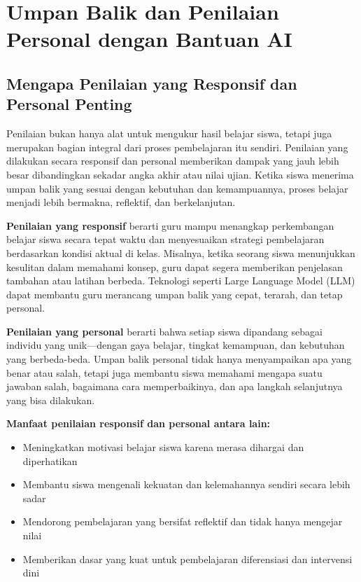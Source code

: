 \chapter{Umpan Balik dan Penilaian Personal dengan Bantuan AI}

\section{Mengapa Penilaian yang Responsif dan Personal Penting}

Penilaian bukan hanya alat untuk mengukur hasil belajar siswa, tetapi juga merupakan bagian integral dari proses pembelajaran itu sendiri. Penilaian yang dilakukan secara responsif dan personal memberikan dampak yang jauh lebih besar dibandingkan sekadar angka akhir atau nilai ujian. Ketika siswa menerima umpan balik yang sesuai dengan kebutuhan dan kemampuannya, proses belajar menjadi lebih bermakna, reflektif, dan berkelanjutan.

\textbf{Penilaian yang responsif} berarti guru mampu menangkap perkembangan belajar siswa secara tepat waktu dan menyesuaikan strategi pembelajaran berdasarkan kondisi aktual di kelas. Misalnya, ketika seorang siswa menunjukkan kesulitan dalam memahami konsep, guru dapat segera memberikan penjelasan tambahan atau latihan berbeda. Teknologi seperti Large Language Model (LLM) dapat membantu guru merancang umpan balik yang cepat, terarah, dan tetap personal.

\textbf{Penilaian yang personal} berarti bahwa setiap siswa dipandang sebagai individu yang unik—dengan gaya belajar, tingkat kemampuan, dan kebutuhan yang berbeda-beda. Umpan balik personal tidak hanya menyampaikan apa yang benar atau salah, tetapi juga membantu siswa memahami mengapa suatu jawaban salah, bagaimana cara memperbaikinya, dan apa langkah selanjutnya yang bisa dilakukan.

\textbf{Manfaat penilaian responsif dan personal antara lain:}
\begin{itemize}
	\item Meningkatkan motivasi belajar siswa karena merasa dihargai dan diperhatikan
	\item Membantu siswa mengenali kekuatan dan kelemahannya sendiri secara lebih sadar
	\item Mendorong pembelajaran yang bersifat reflektif dan tidak hanya mengejar nilai
	\item Memberikan dasar yang kuat untuk pembelajaran diferensiasi dan intervensi dini
\end{itemize}

